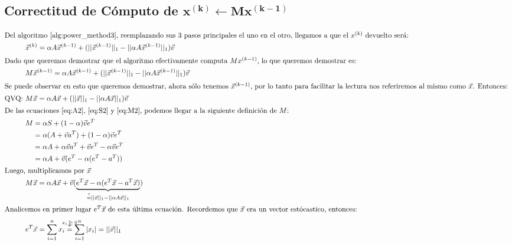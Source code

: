 \subsection{Correctitud de C\'omputo de $\mathbf{x^{(k)}\gets Mx^{(k-1)}}$}
\vspace{-20pt}
\begin{align}
    \intertext{Del algoritmo \ref{alg:power_method3}, reemplazando sus 3 pasos
        principales el uno en el otro, llegamos a que el $x^{(k)}$ devuelto
        ser\'a:}
    &\vec{x}^{(k)} = \alpha A \vec{x}^{(k-1)} + (||\vec{x}^{(k-1)}||_1 - ||\alpha
        A\vec{x}^{(k-1)}||_1)\vec{v}\\
    \intertext{Dado que queremos demostrar que el algoritmo efectivamente
        computa $Mx^{(k-1)}$, lo que queremos demostrar es:}
    &M\vec{x}^{(k-1)} = \alpha A \vec{x}^{(k-1)} + (||\vec{x}^{(k-1)}||_1 -
    ||\alpha A\vec{x}^{(k-1)}||_1)\vec{v}\\
    \intertext{Se puede observar en esto que queremos demostrar, ahora
    s\'olo tenemos $\vec{x}^{(k-1)}$, por lo tanto para facilitar la lectura nos
    referiremos al mismo como $\vec{x}$. Entonces: }
    \text{QVQ: }& M\vec{x} = \alpha A \vec{x} + (||\vec{x}||_1 - ||\alpha
    A\vec{x}||_1)\vec{v}\label{eq:qvq_dem}\\
    \intertext{De las ecuaciones \ref{eq:A2}, \ref{eq:S2} y \ref{eq:M2}, podemos
    llegar a la siguiente definici\'on de $M$:}
    &\begin{aligned}
        M &= \alpha S + (1-\alpha)\vec{v}e^T\\
          &= \alpha(A+\vec{v}a^T)+(1-\alpha)\vec{v}e^T\\
          &= \alpha A+\alpha\vec{v}a^T+\vec{v}e^T-\alpha\vec{v}e^T\\
          &= \alpha A+\vec{v}(e^T-\alpha(e^T-a^T))
    \end{aligned}\\
    \intertext{Luego, multiplicamos por $\vec{x}$}
    &M\vec{x} = \alpha
        A\vec{x} + \vec{v}(\underbrace{e^T\vec{x} - \alpha(e^T\vec{x} -
        a^T\vec{x})}_{\overset{?}{=} ||\vec{x}||_1 - ||\alpha
        A\vec{x}||_1})\label{eq:Mx}\\
    \intertext{Analicemos en primer lugar $e^T\vec{x}$ de esta \'ultima
    ecuaci\'on. Recordemos que $\vec{x}$ era un vector est\'ocastico, entonces:}
    & e^T\vec{x} = \sum_{i=1}^{n}x_i\overarrow[=][\downarrow]{$x_i\geq 0$}
    \sum_{i=1}^{n}|x_i| = ||\vec{x}||_1\label{eq:reemp1}\\

\end{align}
